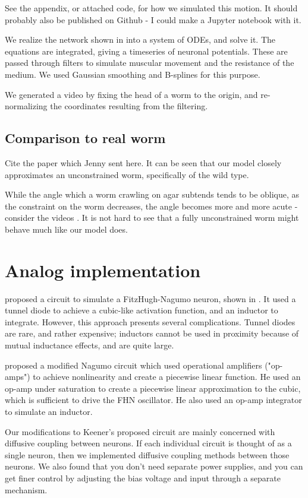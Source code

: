 \documentclass[
    11pt,
]{article}
\begin{document}
See the appendix, or attached code, for how we simulated this motion.  It should probably also be published on Github - I could make a Jupyter notebook with it.

We realize the network shown in  into a system of ODEs, and solve it.  The equations are integrated, giving a timeseries of neuronal potentials.  These are passed through filters to simulate muscular movement and the resistance of the medium.  We used Gaussian smoothing and B-splines for this purpose.

We generated a video by fixing the head of a worm to the origin, and re-normalizing the coordinates resulting from the filtering.

\subsection{Comparison to real worm}

Cite the paper which Jenny sent here.  It can be seen that our model closely approximates an unconstrained worm, specifically of the wild type.

While the angle which a worm crawling on agar subtends tends to be oblique, as the constraint on the worm decreases, the angle becomes more and more acute - consider the videos . It is not hard to see that a fully unconstrained worm might behave much like our model does.

\section{Analog implementation}

\citet{nagumo1962} proposed a circuit to simulate a FitzHugh-Nagumo neuron, shown in .  It used a tunnel diode to achieve a cubic-like activation function, and an inductor to integrate.  However, this approach presents several complications.  Tunnel diodes are rare, and rather expensive; inductors cannot be used in proximity because of mutual inductance effects, and are quite large.

\citet{keener1983} proposed a modified Nagumo circuit which used operational amplifiers ("op-amps") to achieve nonlinearity and create a piecewise linear function.  He used an op-amp under saturation to create a piecewise linear approximation to the cubic, which is sufficient to drive the FHN oscillator.  He also used an op-amp integrator to simulate an inductor.

Our modifications to Keener's proposed circuit are mainly concerned with diffusive coupling between neurons.  If each individual circuit is thought of as a single neuron, then we implemented diffusive coupling methods between those neurons.  We also found that you don't need separate power supplies, and you can get finer control by adjusting the bias voltage and input through a separate mechanism.
\end{document}
